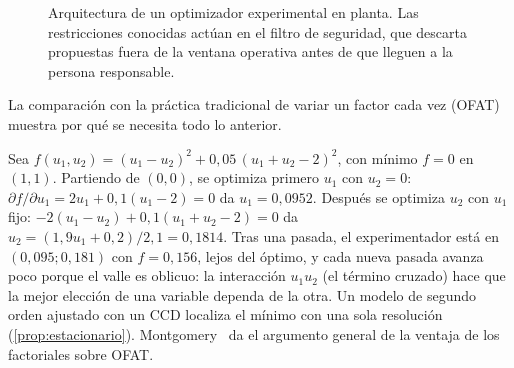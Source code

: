 \begin{figure}[ht]
\centering
{}
\caption{Arquitectura de un optimizador experimental en planta. Las restricciones conocidas actúan en el filtro de seguridad, que descarta propuestas fuera de la ventana operativa antes de que lleguen a la persona responsable.}
\label{fig:arquitectura}
\end{figure}

La comparación con la práctica tradicional de variar un factor cada vez (OFAT) muestra por qué se necesita todo lo anterior.

\begin{ejemplo}\label{ej:ofat}
Sea $f(u_1,u_2)=(u_1-u_2)^2+0{,}05\,(u_1+u_2-2)^2$, con mínimo $f=0$ en $(1,1)$. Partiendo de $(0,0)$, se optimiza primero $u_1$ con $u_2=0$: $\partial f/\partial u_1=2u_1+0{,}1(u_1-2)=0$ da $u_1=0{,}0952$. Después se optimiza $u_2$ con $u_1$ fijo: $-2(u_1-u_2)+0{,}1(u_1+u_2-2)=0$ da $u_2=(1{,}9u_1+0{,}2)/2{,}1=0{,}1814$. Tras una pasada, el experimentador está en $(0{,}095;0{,}181)$ con $f=0{,}156$, lejos del óptimo, y cada nueva pasada avanza poco porque el valle es oblicuo: la interacción $u_1u_2$ (el término cruzado) hace que la mejor elección de una variable dependa de la otra. Un modelo de segundo orden ajustado con un CCD localiza el mínimo con una sola resolución (\cref{prop:estacionario}). Montgomery~\cite[§5.2]{montgomery} da el argumento general de la ventaja de los factoriales sobre OFAT.
\end{ejemplo}

